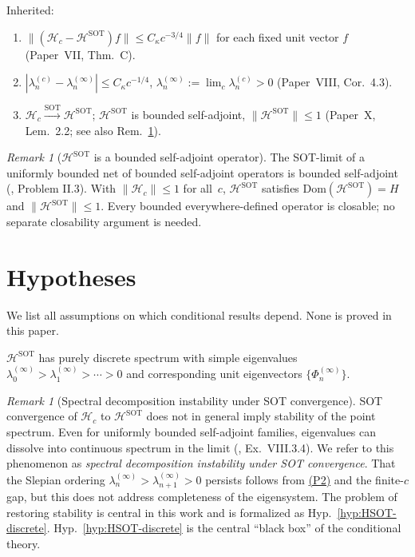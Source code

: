 \documentclass[12pt,a4paper]{amsart}
\theoremstyle{definition}
\theoremstyle{remark}
\newtheorem{remark}[theorem]{Remark}
\newcommand{\Hc}{\mathcal{H}_c}
\newcommand{\HSOT}{\mathcal{H}^{\mathrm{SOT}}}
\newcommand{\Dom}{\mathrm{Dom}}
\begin{document}
Inherited:
\begin{enumerate}[(P1)]
\item\label{P1}
  $\|(\Hc-\HSOT)f\|\le C_\kappa c^{-3/4}\|f\|$
  for each fixed unit vector $f$
  (Paper~VII, Thm.~C).
\item\label{P2}
  $|\lambda_n^{(c)}-\lambda_n^{(\infty)}|\le C_\kappa c^{-1/4}$,
  $\lambda_n^{(\infty)}:=\lim_c\lambda_n^{(c)}>0$
  (Paper~VIII, Cor.~4.3).
\item\label{P3}
  $\Hc\xrightarrow{\mathrm{SOT}}\HSOT$;
  $\HSOT$ is bounded self-adjoint, $\|\HSOT\|\le 1$
  (Paper~X, Lem.~2.2; see also
  Rem.~\ref{rem:HSOT-bounded}).
\end{enumerate}

\begin{remark}[$\HSOT$ is a bounded self-adjoint operator]
\label{rem:HSOT-bounded}
The SOT-limit of a uniformly bounded net of
bounded self-adjoint operators is bounded self-adjoint
(\cite{ReedSimon1975}, Problem II.3).
With $\|\Hc\|\le 1$ for all~$c$, $\HSOT$ satisfies
$\Dom(\HSOT)=H$ and $\|\HSOT\|\le 1$.
Every bounded everywhere-defined operator is closable;
no separate closability argument is needed.
\end{remark}

\section{Hypotheses}
\label{sec:hypotheses}

We list all assumptions on which conditional results
depend. None is proved in this paper.

\begin{hypothesis}[Discrete spectrum of $\HSOT$]
\label{hyp:HSOT-discrete}
$\HSOT$ has purely discrete spectrum with simple
eigenvalues $\lambda_0^{(\infty)}>\lambda_1^{(\infty)}
>\cdots>0$ and corresponding unit eigenvectors
$\{\Phi_n^{(\infty)}\}$.
\end{hypothesis}

\begin{remark}[Spectral decomposition instability under SOT convergence]
\label{rem:HSOT-discrete-hard}
SOT convergence of $\Hc$ to $\HSOT$ does not in general
imply stability of the point spectrum.
Even for uniformly bounded self-adjoint families,
eigenvalues can dissolve into continuous spectrum
in the limit (\cite{ReedSimon1975}, Ex.~VIII.3.4).
We refer to this phenomenon as
\emph{spectral decomposition instability under SOT convergence}.
That the Slepian ordering $\lambda_n^{(\infty)}
>\lambda_{n+1}^{(\infty)}>0$ persists follows from
\hyperref[P2]{(P2)} and the finite-$c$ gap,
but this does not address completeness of the eigensystem.
The problem of restoring stability is central in this work
and is formalized as Hyp.~\ref{hyp:HSOT-discrete}.
Hyp.~\ref{hyp:HSOT-discrete} is the central
``black box'' of the conditional theory.
\end{remark}
\end{document}
